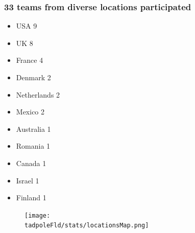 \documentclass[8pt,xcolor=table]{beamer}
\begin{document}
\newcommand{\pie}[4][]{
    \begin{scope}[#1]
    \pgfmathsetmacro{\curA}{90}
    \pgfmathsetmacro{\r}{1}
    \def\c{(0,0)}
    \node[pie title] at (90:1.3) {#2};
    \pgfmathsetmacro{\sumAll}{0}
     \foreach \v/\s in{#3}{
        \pgfmathsetmacro{\sumAllTwo}{\v + \sumAll}
        \pgfmathsetmacro{\sumAll}{\sumAllTwo}
    }
    \foreach \v/\s in{#3}{
	\pgfmathsetmacro{\argFour}{#4}
        \pgfmathsetmacro{\deltaA}{\v/\argFour * 360}
        \pgfmathsetmacro{\nextA}{\curA + \deltaA}
        \pgfmathsetmacro{\midA}{(\curA+\nextA)/2}

        \path[slice,\s] \c
            -- +(\curA:\r)
            arc (\curA:\nextA:\r)
            -- cycle;
        \pgfmathsetmacro{\d}{max((\deltaA * -(.5/50) + 1) , .5)}

        \begin{pgfonlayer}{foreground}
        \path \c -- node[pos=\d,pie values,values of \s]{$\v$} +(\midA:\r);
        \end{pgfonlayer}

        \global\let\curA\nextA
    }
    \end{scope}
}


\newcommand{\legend}[2][]{
    \begin{scope}[#1]
    \path
        \foreach \n/\s in {#2}
            {
                  ++(0,-10pt) node[\s,legend box] {} +(5pt,0) node[legend label] {\LARGE{\n}}
            }
    ;
    \end{scope}
}


\begin{frame}
\frametitle{33 teams from diverse locations participated}

\begin{multicols}{3}
\begin{itemize}
\item USA 9
\item UK 8
\item France 4
\item Denmark 2
\item Netherlands 2
\item Mexico 2
\item Australia 1
\item Romania 1
\item Canada 1
\item Israel 1
\item Finland 1
\end{itemize}
\end{multicols}


\begin{figure}
 \texttt{[image: \\tadpoleFld/stats/locationsMap.png]}
\end{figure}

\end{frame}
\end{document}
